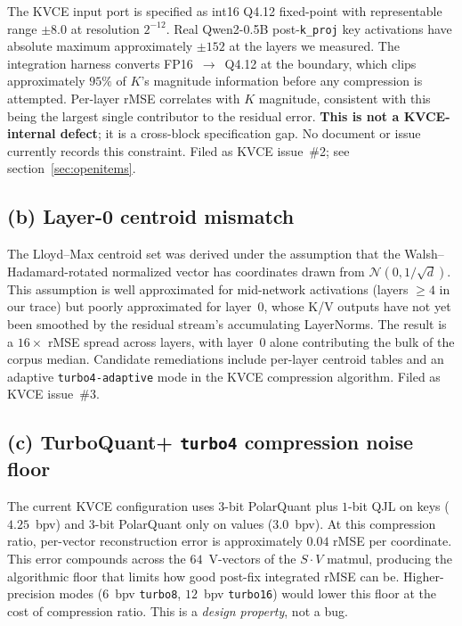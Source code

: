 \documentclass[11pt]{article}
\begin{document}
The KVCE input port is specified as int16 Q4.12 fixed-point with
representable range $\pm 8.0$ at resolution $2^{-12}$. Real
Qwen2-0.5B post-\texttt{k\_proj} key activations have absolute
maximum approximately $\pm 152$ at the layers we measured. The
integration harness converts FP16~$\rightarrow$~Q4.12 at the
boundary, which clips approximately $95\%$ of $K$'s magnitude
information before any compression is attempted. Per-layer rMSE
correlates with $K$ magnitude, consistent with this being the
largest single contributor to the residual error. \textbf{This is
not a KVCE-internal defect}; it is a cross-block specification
gap. No document or issue currently records this constraint.
Filed as KVCE issue~\#2; see section~\ref{sec:openitems}.

\subsection*{(b) Layer-0 centroid mismatch}

The Lloyd--Max centroid set was derived under the assumption that
the Walsh--Hadamard-rotated normalized vector has coordinates drawn
from $\mathcal{N}(0, 1/\sqrt{d})$. This assumption is well approximated
for mid-network activations (layers $\geq 4$ in our trace) but
poorly approximated for layer~$0$, whose K/V outputs have not yet
been smoothed by the residual stream's accumulating LayerNorms.
The result is a $16\times$ rMSE spread across layers, with
layer~$0$ alone contributing the bulk of the corpus median.
Candidate remediations include per-layer centroid tables and an
adaptive \texttt{turbo4-adaptive} mode in the KVCE compression
algorithm. Filed as KVCE issue~\#3.

\subsection*{(c) TurboQuant+ \texttt{turbo4} compression noise floor}

The current KVCE configuration uses $3$-bit PolarQuant plus $1$-bit
QJL on keys ($4.25$~bpv) and $3$-bit PolarQuant only on values
($3.0$~bpv). At this compression ratio, per-vector reconstruction
error is approximately $0.04$ rMSE per coordinate. This error
compounds across the $64$~V-vectors of the $S \cdot V$ matmul,
producing the algorithmic floor that limits how good post-fix
integrated rMSE can be. Higher-precision modes ($6$~bpv
\texttt{turbo8}, $12$~bpv \texttt{turbo16}) would lower this floor
at the cost of compression ratio. This is a \emph{design property},
not a bug.
\end{document}
